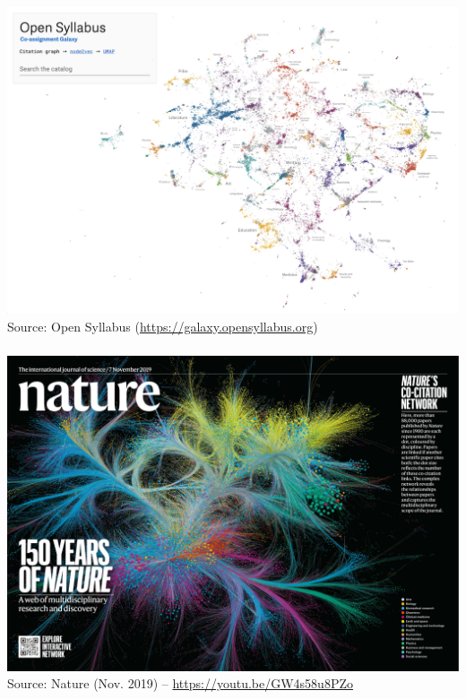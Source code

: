 \documentclass[8pt]{beamer}
\begin{document}

\begin{frame}
\frametitle{\insertsection}
\centering
\includegraphics[width=\linewidth,height=0.8\textheight,keepaspectratio]{open_syllabus}\\
\tiny Source: Open Syllabus (\url{https://galaxy.opensyllabus.org})
\end{frame}



\begin{frame}
\frametitle{\insertsection}
\centering
\includegraphics[width=0.9\linewidth,height=\textheight,keepaspectratio]{nature}\\
\tiny Source: Nature (Nov. 2019) -- \url{https://youtu.be/GW4s58u8PZo}
\end{frame}
\end{document}

